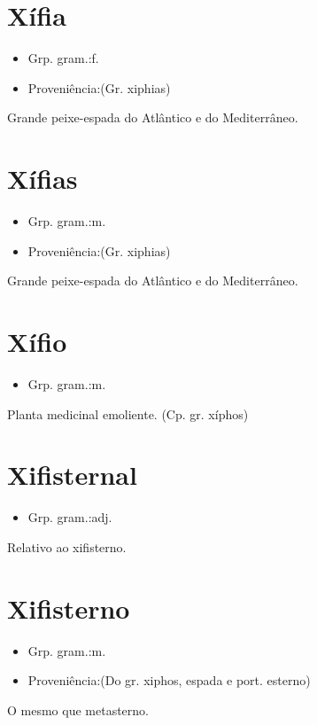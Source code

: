 \section{Xífia}
\begin{itemize}
\item {Grp. gram.:f.}
\end{itemize}
\begin{itemize}
\item {Proveniência:(Gr. \textunderscore xiphias\textunderscore )}
\end{itemize}
Grande peixe-espada do Atlântico e do Mediterrâneo.
\section{Xífias}
\begin{itemize}
\item {Grp. gram.:m.}
\end{itemize}
\begin{itemize}
\item {Proveniência:(Gr. \textunderscore xiphias\textunderscore )}
\end{itemize}
Grande peixe-espada do Atlântico e do Mediterrâneo.
\section{Xífio}
\begin{itemize}
\item {Grp. gram.:m.}
\end{itemize}
Planta medicinal emoliente.
(Cp. gr. \textunderscore xíphos\textunderscore )
\section{Xifisternal}
\begin{itemize}
\item {Grp. gram.:adj.}
\end{itemize}
Relativo ao xifisterno.
\section{Xifisterno}
\begin{itemize}
\item {Grp. gram.:m.}
\end{itemize}
\begin{itemize}
\item {Proveniência:(Do gr. \textunderscore xiphos\textunderscore , espada e port. \textunderscore esterno\textunderscore )}
\end{itemize}
O mesmo que \textunderscore metasterno\textunderscore .
